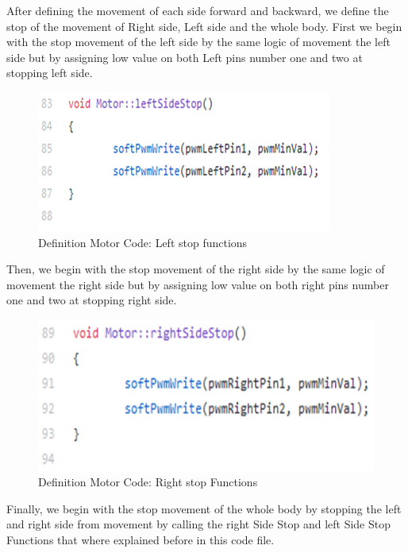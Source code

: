 \documentclass{article}
\begin{document}
\newpage

 After defining the movement of each side forward and backward, we define the stop of the movement of Right side, Left side and the whole body. First we begin with the stop movement of the left side by the same logic of movement the left side but by assigning low value on both Left pins number one and two at stopping left side.

\begin{figure}[h]
    \centering
    \includegraphics{figures/65.png}
    \caption{Definition Motor Code: Left stop functions}
    \label{fig:my_label}
\end{figure}


Then, we begin with the stop movement of the right side by the same logic of movement the right side but by assigning low value on both right pins number one and two at stopping right side.

\begin{figure}[h]
    \centering
    \includegraphics{figures/66.png}
    \caption{Definition Motor Code: Right stop Functions}
    \label{fig:my_label}
\end{figure}

\newpage

Finally, we begin with the stop movement of the whole body by stopping the left and right side from movement by calling the right Side Stop and left Side Stop Functions that where explained before in this code file.
\end{document}
